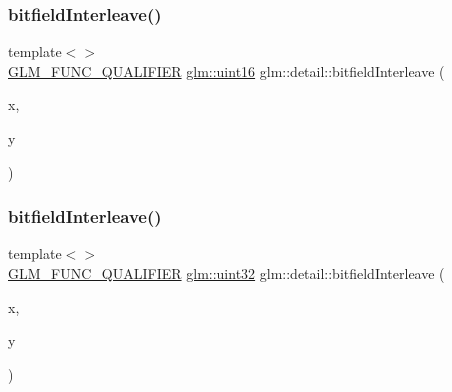 \subsubsection{\texorpdfstring{bitfield\+Interleave()}{bitfieldInterleave()}\hspace{0.1cm}{\footnotesize\ttfamily [4/11]}}
{\footnotesize\ttfamily template$<$$>$ \\
\hyperlink{setup_8hpp_a33fdea6f91c5f834105f7415e2a64407}{G\+L\+M\+\_\+\+F\+U\+N\+C\+\_\+\+Q\+U\+A\+L\+I\+F\+I\+ER} \hyperlink{group__gtc__type__precision_gad8c2939e1fdd8e5828b31d95c52255d5}{glm\+::uint16} glm\+::detail\+::bitfield\+Interleave (\begin{DoxyParamCaption}\item[{\hyperlink{group__gtc__type__precision_ga1a7dcd8aac97cc8020817c94049deff2}{glm\+::uint8}}]{x,  }\item[{\hyperlink{group__gtc__type__precision_ga1a7dcd8aac97cc8020817c94049deff2}{glm\+::uint8}}]{y }\end{DoxyParamCaption})}

\mbox{\label{namespaceglm_1_1detail_ac5f2b38221d4447775e88f1b003f8113}} 
\subsubsection{\texorpdfstring{bitfield\+Interleave()}{bitfieldInterleave()}\hspace{0.1cm}{\footnotesize\ttfamily [5/11]}}
{\footnotesize\ttfamily template$<$$>$ \\
\hyperlink{setup_8hpp_a33fdea6f91c5f834105f7415e2a64407}{G\+L\+M\+\_\+\+F\+U\+N\+C\+\_\+\+Q\+U\+A\+L\+I\+F\+I\+ER} \hyperlink{group__gtc__type__precision_ga202b6a53c105fcb7e531f9b443518451}{glm\+::uint32} glm\+::detail\+::bitfield\+Interleave (\begin{DoxyParamCaption}\item[{\hyperlink{group__gtc__type__precision_gad8c2939e1fdd8e5828b31d95c52255d5}{glm\+::uint16}}]{x,  }\item[{\hyperlink{group__gtc__type__precision_gad8c2939e1fdd8e5828b31d95c52255d5}{glm\+::uint16}}]{y }\end{DoxyParamCaption})}

\mbox{\label{namespaceglm_1_1detail_a7f40bc91b3d293fae0f7df8de85cdcc6}} 
